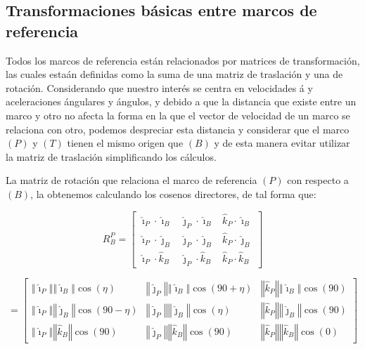 \subsection{Transformaciones b\'{a}sicas entre marcos de referencia}

Todos los marcos de referencia est\'{a}n relacionados por matrices de
transformaci\'{o}n, las cuales esta\'{a}n definidas como la suma de una matriz de traslaci\'{o}n
y una de rotaci\'{o}n. Considerando que nuestro inter\'{e}s se centra en velocidades \'{a} y aceleraciones \'{a}ngulares y \'{a}ngulos, y debido a que la
distancia que existe entre un marco y otro no afecta la forma en la que el
vector de velocidad de un marco se relaciona con otro, podemos despreciar esta distancia y considerar que el marco $%
\left( P\right) $ y $\left( T\right) $ tienen el mismo origen que $\left(
B\right) $ y de esta manera evitar utilizar la matriz de traslaci\'{o}n simplificando los c\'{a}lculos.

La matriz de rotaci\'{o}n que relaciona el marco de referencia $\left(
P\right) $ con respecto a $\left( B\right) $, la obtenemos calculando los
cosenos directores, de tal forma que:

\begin{equation*}
R_{B}^{P}=\left[ 
\begin{array}{lll}
\hat{\imath}_{P}\cdot \hat{\imath}_{B} & \hat{\jmath}_{P}\cdot \hat{\imath}%
_{B} & \hat{k}_{P}\cdot \hat{\imath}_{B} \\ 
\hat{\imath}_{P}\cdot \hat{\jmath}_{B} & \hat{\jmath}_{P}\cdot \hat{\jmath}%
_{B} & \hat{k}_{P}\cdot \hat{\jmath}_{B} \\ 
\hat{\imath}_{P}\cdot \hat{k}_{B} & \hat{\jmath}_{P}\cdot \hat{k}_{B}
& \hat{k}_{P}\cdot \hat{k}_{B}%
\end{array}%
\right]
\end{equation*}

\begin{equation*}
=\left[ 
\begin{array}{ccc}
\left\Vert \hat{\imath}_{P}\right\Vert \left\Vert \hat{\imath}%
_{B}\right\Vert \cos (\eta )\text{ \ \ \ \ \ \ \ } & \left\Vert \hat{\jmath}%
_{P}\right\Vert \left\Vert \hat{\imath}_{B}\right\Vert \cos (90+\eta ) & 
\left\Vert \hat{k}_{P}\right\Vert \left\Vert \hat{\imath}_{B}\right\Vert
\cos (90) \\ 
\left\Vert \hat{\imath}_{P}\right\Vert \left\Vert \hat{\jmath}%
_{B}\right\Vert \cos (90-\eta ) & \left\Vert \hat{\jmath}_{P}\right\Vert
\left\Vert \hat{\jmath}_{B}\right\Vert \cos (\eta )\text{ \ \ \ \ \ \ } & 
\left\Vert \hat{k}_{P}\right\Vert \left\Vert \hat{\jmath}_{B}\right\Vert
\cos (90) \\ 
\left\Vert \hat{\imath}_{P}\right\Vert \left\Vert \hat{k}_{B}\right\Vert
\cos (90)\text{ \ \ \ \ } & \left\Vert \hat{\jmath}_{P}\right\Vert
\left\Vert \hat{k}_{B}\right\Vert \cos (90)\text{ \ \ \ } & \left\Vert 
\hat{k}_{P}\right\Vert \left\Vert \hat{k}_{B}\right\Vert \cos (0)%
\text{ }%
\end{array}%
\right]
\end{equation*}

